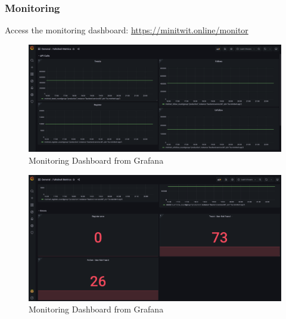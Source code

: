 \subsubsection{Monitoring}
\label{app:monitoring}
Access the \mini monitoring dashboard: \href{https://minitwit.online/monitor}{https://minitwit.online/monitor}
\begin {figure}[H]
    \centering
    \includegraphics[scale=0.30]{images/monitoring/monitoring1.PNG}
    \caption{Monitoring Dashboard from  Grafana}
    \label{fig:simMonitor}
\end{figure}
\begin {figure}[H]
    \centering
    \includegraphics[scale=0.30]{images/monitoring/monitoring2.PNG}
    \caption{Monitoring Dashboard from  Grafana}
    \label{fig:simMonitor}
\end{figure}

